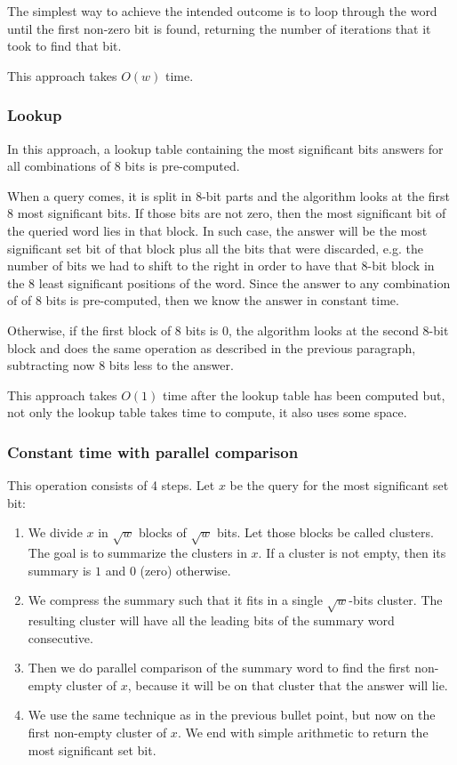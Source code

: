 The simplest way to achieve the intended outcome is to loop through the word until the first non-zero bit is found, returning the number of iterations that it took to find that bit.

This approach takes $O(w)$ time.

\subsubsection{Lookup}

In this approach, a lookup table containing the most significant bits answers for all combinations of 8 bits is pre-computed.

When a query comes, it is split in 8-bit parts and the algorithm looks at the first 8 most significant bits. If those bits are not zero, then the most significant bit of the queried word lies in that block. In such case, the answer will be the most significant set bit of that block plus all the bits that were discarded, e.g. the number of bits we had to shift to the right in order to have that 8-bit block in the 8 least significant positions of the word. Since the answer to any combination of of 8 bits is pre-computed, then we know the answer in constant time.

Otherwise, if the first block of 8 bits is 0, the algorithm looks at the second 8-bit block and does the same operation as described in the previous paragraph, subtracting now 8 bits less to the answer.

This approach takes $O(1)$ time after the lookup table has been computed but, not only the lookup table takes time to compute, it also uses some space.

\subsubsection{Constant time with parallel comparison}

This operation consists of 4 steps. Let $x$ be the query for the most significant set bit:
\begin{enumerate}
    \item
    We divide $x$ in $\sqrt{w}$ blocks of $\sqrt{w}$ bits. Let those blocks be called clusters. The goal is to summarize the clusters in $x$. If a cluster is not empty, then its summary is $1$ and $0$  (zero) otherwise.
    \item
    We compress the summary such that it fits in a single $\sqrt{w}$-bits cluster. The resulting cluster will have all the leading bits of the summary word consecutive.
    \item
    Then we do parallel comparison of the summary word to find the first non-empty cluster of $x$, because it will be on that cluster that the answer will lie.
    \item
    We use the same technique as in the previous bullet point, but now on the first non-empty cluster of $x$. We end with simple arithmetic to return the most significant set bit. 
\end{enumerate}

